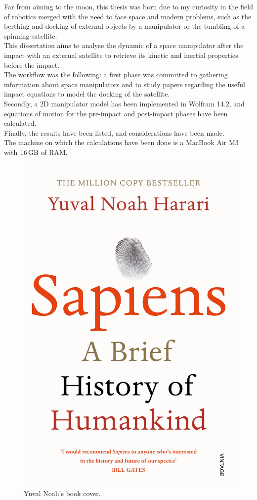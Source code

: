 \documentclass[a4paper,12pt,oneside]{report}
\begin{document}
Far from aiming to the moon, this thesis was born due to my curiosity in the field of robotics merged with the need to face space and modern problems, such as the berthing and docking of external objects by a manipulator or the tumbling of a spinning satellite.\\
This dissertation aims to analyse the dynamic of a space manipulator after the impact with an external satellite to retrieve its kinetic and inertial properties before the impact.\\ 
The workflow was the following: a first phase was committed to gathering information about space manipulators and to study papers regarding the useful impact equations to model the docking of the satellite.\\
Secondly, a 2D manipulator model has been implemented in Wolfram 14.2, and equations of motion for the pre-impact and post-impact phases have been calculated.\\
Finally, the results have been listed, and considerations have been made.\\
The machine on which the calculations have been done is a MacBook Air M3 with $\SI{16}{\giga\byte}$ of RAM.
\vspace{0.8cm}
\begin{figure}[h]
  \centering
  \includegraphics[scale=0.15]{sapiens.jpg}
  \caption{Yuval Noah's book cover.}
\end{figure}
\clearpage
{}
\end{document}
